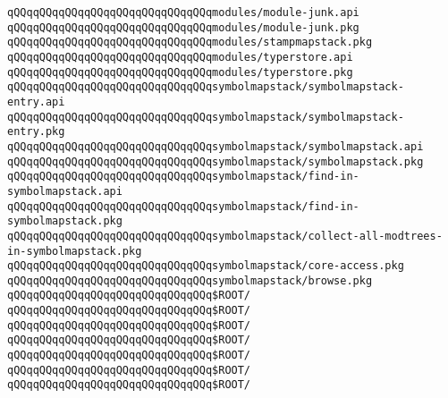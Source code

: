 \verb|qQQqqQQqqQQqqQQqqQQqqQQqqQQqqQQqmodules/module-junk.api|\newline
\verb|qQQqqQQqqQQqqQQqqQQqqQQqqQQqqQQqmodules/module-junk.pkg|\newline
\verb|qQQqqQQqqQQqqQQqqQQqqQQqqQQqqQQqmodules/stampmapstack.pkg|\newline
\verb|qQQqqQQqqQQqqQQqqQQqqQQqqQQqqQQqmodules/typerstore.api|\newline
\verb|qQQqqQQqqQQqqQQqqQQqqQQqqQQqqQQqmodules/typerstore.pkg|\newline
\newline
\verb|qQQqqQQqqQQqqQQqqQQqqQQqqQQqqQQqsymbolmapstack/symbolmapstack-entry.api|\newline
\verb|qQQqqQQqqQQqqQQqqQQqqQQqqQQqqQQqsymbolmapstack/symbolmapstack-entry.pkg|\newline
\verb|qQQqqQQqqQQqqQQqqQQqqQQqqQQqqQQqsymbolmapstack/symbolmapstack.api|\newline
\verb|qQQqqQQqqQQqqQQqqQQqqQQqqQQqqQQqsymbolmapstack/symbolmapstack.pkg|\newline
\verb|qQQqqQQqqQQqqQQqqQQqqQQqqQQqqQQqsymbolmapstack/find-in-symbolmapstack.api|\newline
\verb|qQQqqQQqqQQqqQQqqQQqqQQqqQQqqQQqsymbolmapstack/find-in-symbolmapstack.pkg|\newline
\verb|qQQqqQQqqQQqqQQqqQQqqQQqqQQqqQQqsymbolmapstack/collect-all-modtrees-in-symbolmapstack.pkg|\newline
\verb|qQQqqQQqqQQqqQQqqQQqqQQqqQQqqQQqsymbolmapstack/core-access.pkg|\newline
\verb|qQQqqQQqqQQqqQQqqQQqqQQqqQQqqQQqsymbolmapstack/browse.pkg|\newline
\newline
\verb|qQQqqQQqqQQqqQQqqQQqqQQqqQQqqQQq$ROOT/|\newline
\verb|qQQqqQQqqQQqqQQqqQQqqQQqqQQqqQQq$ROOT/|\newline
\newline
\verb|qQQqqQQqqQQqqQQqqQQqqQQqqQQqqQQq$ROOT/|\newline
\verb|qQQqqQQqqQQqqQQqqQQqqQQqqQQqqQQq$ROOT/|\newline
\newline
\verb|qQQqqQQqqQQqqQQqqQQqqQQqqQQqqQQq$ROOT/|\newline
\verb|qQQqqQQqqQQqqQQqqQQqqQQqqQQqqQQq$ROOT/|\newline
\verb|qQQqqQQqqQQqqQQqqQQqqQQqqQQqqQQq$ROOT/|\newline

